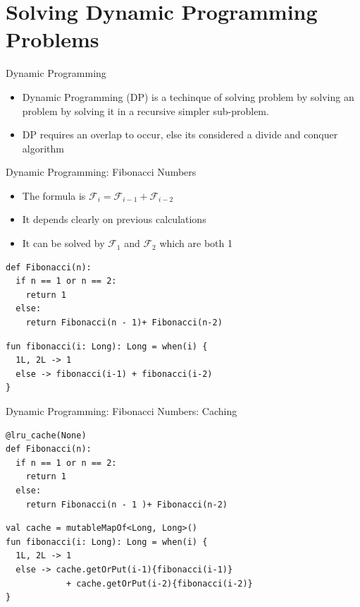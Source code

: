 \documentclass[11pt,pdf, aspectratio=169]{beamer}
\begin{document}
  \section{Solving Dynamic Programming Problems}
  \begin{frame}{Dynamic Programming}
    \begin{itemize}
      \item Dynamic Programming (DP) is a techinque of solving problem by solving an problem by solving it in a recursive simpler sub-problem.
      \item DP requires an overlap to occur, else its considered a divide and conquer algorithm
    \end{itemize}
  \end{frame}
  \begin{frame}[containsverbatim]{Dynamic Programming: Fibonacci Numbers}
    \begin{itemize}
      \item The formula is $\mathcal{F}_i = \mathcal{F}_{i-1} + \mathcal{F}_{i-2}$
      \item It depends clearly on previous calculations
      \item It can be solved by $\mathcal{F}_1$ and $\mathcal{F}_2$ which are both 1
    \end{itemize}
    \begin{verbatim}
def Fibonacci(n):
  if n == 1 or n == 2:
    return 1
  else:
    return Fibonacci(n - 1)+ Fibonacci(n-2)
    \end{verbatim}
    \begin{verbatim}
fun fibonacci(i: Long): Long = when(i) {
  1L, 2L -> 1
  else -> fibonacci(i-1) + fibonacci(i-2)
}
    \end{verbatim}
  \end{frame}
  \begin{frame}[containsverbatim]{Dynamic Programming: Fibonacci Numbers: Caching}
    \begin{verbatim}
@lru_cache(None)
def Fibonacci(n):
  if n == 1 or n == 2:
    return 1
  else:
    return Fibonacci(n - 1 )+ Fibonacci(n-2)
    \end{verbatim}
    \begin{verbatim}
val cache = mutableMapOf<Long, Long>()
fun fibonacci(i: Long): Long = when(i) {
  1L, 2L -> 1
  else -> cache.getOrPut(i-1){fibonacci(i-1)}
            + cache.getOrPut(i-2){fibonacci(i-2)}
}
    \end{verbatim}
  \end{frame}
\end{document}
